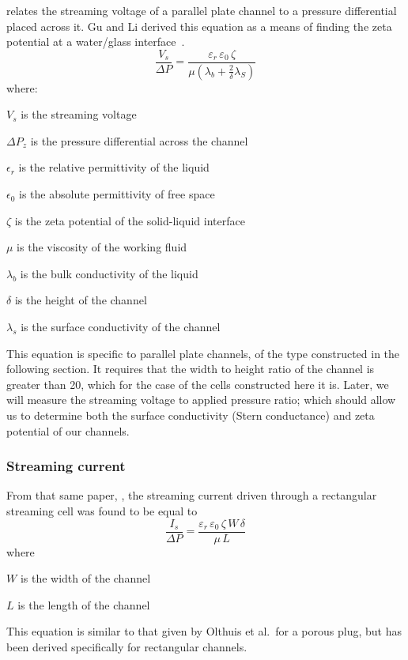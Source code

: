        relates the streaming voltage of a parallel plate channel to a pressure differential placed across it.
      Gu and Li derived this equation as a means of finding the zeta potential at a water/glass interface~\cite{Gu2000a}.
      \begin{equation}
      \frac{V_{s}}{\Delta P} = \frac{\varepsilon_{r}\,\varepsilon_{0}\,\zeta}{\mu(\lambda_{b}+\frac{2}{\delta}\lambda_{S})}
      \label{eq:streamingVoltage_with_pressure}
      \end{equation}
      \noindent where:
      \begin{description}
          \item $V_{s}$ is the streaming voltage
          \item $\Delta P_{z}$ is the pressure differential across the channel
          \item $\epsilon_{r}$ is the relative permittivity of the liquid
          \item $\epsilon_{0}$ is the absolute permittivity of free space
          \item $\zeta$ is the zeta potential of the solid-liquid interface
          \item $\mu$ is the viscosity of the working fluid
          \item $\lambda_{b}$ is the bulk conductivity of the liquid
          \item $\delta$ is the height of the channel
          \item $\lambda_{s}$ is the surface conductivity of the channel
      \end{description}
      This equation is specific to parallel plate channels, of the type constructed in the following section.
      It requires that the width to height ratio of the channel is greater than 20, which for the case of the cells constructed here it is.
      Later, we will measure the streaming voltage to applied pressure ratio; which should allow us to determine both the surface conductivity (Stern conductance) and zeta potential of our channels.


    \subsubsection*{Streaming current}


      From that same paper, \cite{Gu2000}, the streaming current driven through a rectangular streaming cell was found to be equal to
      \begin{equation}
          \frac{I_{s}}{\Delta P} = \frac{\varepsilon_{r}\,\varepsilon_{0}\,\zeta\,W\,\delta}{\mu\,L}
          \label{eq:StreamingCell_StreamingCurrentFunc}
      \end{equation}
      where
      \begin{description}
          \item $W$ is the width of the channel
          \item $L$ is the length of the channel
      \end{description}
      This equation is similar to that given by Olthuis et al.\ for a porous plug, but has been derived specifically for rectangular channels\cite{Olthuis2005}.


